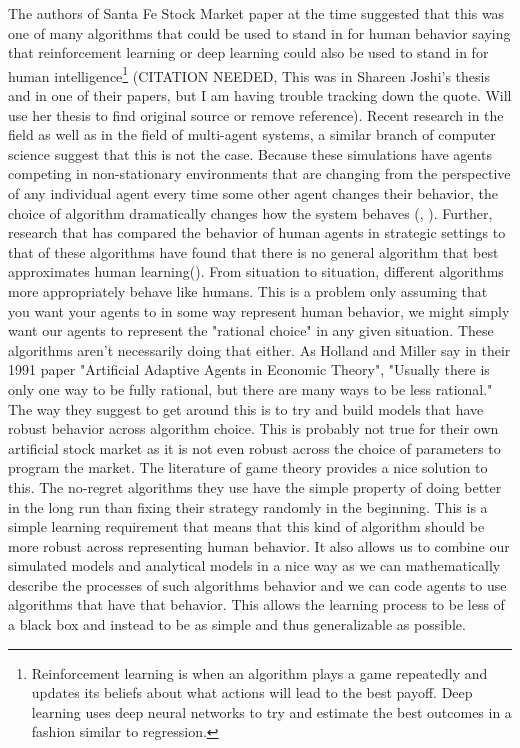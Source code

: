 \documentclass[12pt,twoside]{reedthesis}
\begin{document}
The authors of Santa Fe Stock Market paper at the time suggested that this was one of many algorithms that could be used to stand in for human behavior saying that reinforcement learning or deep learning could also be used to stand in for human intelligence\footnote{Reinforcement learning is when an algorithm plays a game repeatedly and updates its beliefs about what actions will lead to the best payoff. Deep learning uses deep neural networks to try and estimate the best outcomes in a fashion similar to regression.} (CITATION NEEDED, This was in Shareen Joshi's thesis and in one of their papers, but I am having trouble tracking down the quote. Will use her thesis to find original source or remove reference). Recent research in the field as well as in the field of multi-agent systems, a similar branch of computer science suggest that this is not the case. Because these simulations have agents competing in non-stationary environments that are changing from the perspective of any individual agent every time some other agent changes their behavior, the choice of algorithm dramatically changes how the system behaves (\cite{Rejeb2005}, \cite{Shoham2008}). Further, research that has compared the behavior of human agents in strategic settings to that of these algorithms have found that there is no general algorithm that best approximates human learning(\cite{Tesfatsion2002}). From situation to situation, different algorithms more appropriately behave like humans. This is a problem only assuming that you want your agents to in some way represent human behavior, we might simply want our agents to represent the "rational choice" in any given situation. These algorithms aren't necessarily doing that either. As Holland and Miller say in their 1991 paper "Artificial Adaptive Agents in Economic Theory", "Usually there is only one way to be fully rational, but there are many ways to be less rational." The way they suggest to get around this is to try and build models that have robust behavior across algorithm choice. This is probably not true for their own artificial stock market as it is not even robust across the choice of parameters to program the market. The literature of game theory provides a nice solution to this. The no-regret algorithms they use have the simple property of doing better in the long run than fixing their strategy randomly in the beginning. This is a simple learning requirement that means that this kind of algorithm should be more robust across representing human behavior. It also allows us to combine our simulated models and analytical models in a nice way as we can mathematically describe the processes of such algorithms behavior and we can code agents to use algorithms that have that behavior. This allows the learning process to be less of a black box and instead to be as simple and thus generalizable as possible.
\end{document}
